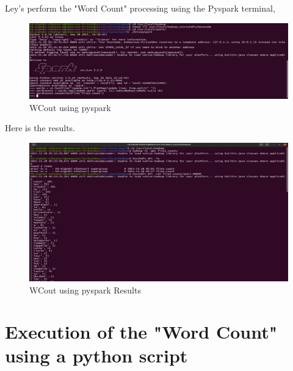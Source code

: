 \begin{spacing}{1.2}
\par Ley's perform the "Word Count" processing using the Pyspark terminal,
\\
\begin{figure}[!htb] 
\begin{center} 
\includegraphics[width=1\linewidth]{Big_Data/Spark/Executing WCount using scala/WCout using pyspark} 
\end{center} 
\caption{WCout using pyspark} 
\end{figure} 
\FloatBarrier



\par Here is the results.
\\
\begin{figure}[!htb] 
\begin{center} 
\includegraphics[width=1\linewidth]{Big_Data/Spark/Executing WCount using scala/WCout using pyspark Results} 
\end{center} 
\caption{WCout using pyspark Results} 
\end{figure} 
\FloatBarrier

\section{Execution of the "Word Count" using a python script}


\end{spacing}
